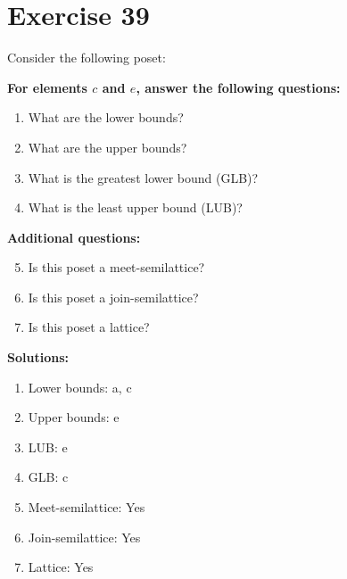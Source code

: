 \documentclass{article}
\begin{document}
\section*{Exercise 39}
Consider the following poset:
\begin{center}
\end{center}

    \textbf{For elements $c$ and $e$, answer the following questions:}
\begin{enumerate}
    \item What are the lower bounds?
    \item What are the upper bounds?
    \item What is the greatest lower bound (GLB)?
    \item What is the least upper bound (LUB)?
\end{enumerate}
    \hspace*{3ex} \textbf{Additional questions:}
\begin{enumerate}
    \setcounter{enumi}{4}
    \item Is this poset a meet-semilattice?
    \item Is this poset a join-semilattice?
    \item Is this poset a lattice?
\end{enumerate}

\textbf{Solutions:}
\begin{enumerate}
    \item Lower bounds: {a, c}
    \item Upper bounds: {e}
    \item LUB: e
    \item GLB: c
    \item Meet-semilattice: Yes
    \item Join-semilattice: Yes
    \item Lattice: Yes
\end{enumerate}
\newpage
\end{document}
